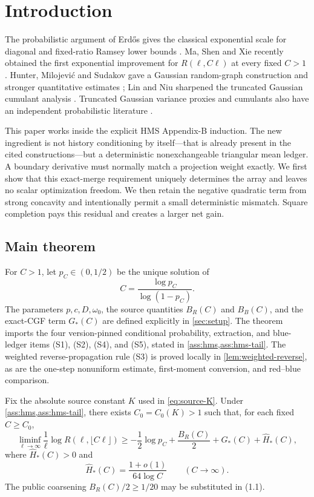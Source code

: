 \section{Introduction}

The probabilistic argument of Erd\H{o}s gives the classical exponential scale
for diagonal and fixed-ratio Ramsey lower bounds \cite{Erdos1947}.  Ma, Shen
and Xie recently obtained the first exponential improvement for
\(R(\ell,C\ell)\) at every fixed \(C>1\) \cite{MaShenXie2025}.  Hunter,
Milojevi\'c and Sudakov gave a Gaussian random-graph construction and stronger
quantitative estimates \cite{HMS2025}; Lin and Niu sharpened the truncated
Gaussian cumulant analysis \cite{LinNiu2026}.  Truncated Gaussian variance
proxies and cumulants also have an independent probabilistic literature
\cite{BarretoMarchalArbel2024}.

This paper works inside the explicit HMS Appendix-B induction.  The new
ingredient is not history conditioning by itself---that is already present in
the cited constructions---but a deterministic nonexchangeable triangular
mean ledger.  A boundary derivative must normally match a projection weight
exactly.  We first show that this exact-merge requirement uniquely determines
the array and leaves no scalar optimization freedom.  We then retain the
negative quadratic term from strong concavity and intentionally permit a
small deterministic mismatch.  Square completion pays this residual and
creates a larger net gain.

\subsection{Main theorem}

For \(C>1\), let \(p_C\in(0,1/2)\) be the unique solution of
\[
 C=\frac{\log p_C}{\log(1-p_C)}.
\]
The parameters \(p,c,D,\omega_0\), the source quantities \(B_R(C)\) and
\(B_B(C)\), and the exact-CGF term \(G_*(C)\) are defined explicitly in
\cref{sec:setup}.  The theorem imports the four version-pinned conditional
probability, extraction, and blue-ledger items (S1), (S2), (S4), and (S5),
stated in \cref{ass:hms,ass:hms-tail}.  The weighted reverse-propagation rule
(S3) is proved locally in \cref{lem:weighted-reverse}, as are the one-step
nonuniform estimate, first-moment conversion, and red--blue comparison.

\begin{theorem}\label{thm:main-lower}
Fix the absolute source constant \(K\) used in \eqref{eq:source-K}.  Under
\cref{ass:hms,ass:hms-tail}, there exists \(C_0=C_0(K)>1\) such that, for each
fixed \(C\ge C_0\),
\[
\liminf_{\ell\to\infty}\frac1\ell
\log R(\ell,\lfloor C\ell\rfloor)
\ge
-\frac12\log p_C+\frac{B_R(C)}2+G_*(C)+\widehat H_*(C),
\tag{1.1}
\]
where \(\widehat H_*(C)>0\) and
\[
 \widehat H_*(C)=\frac{1+o(1)}{64\log C}\qquad(C\to\infty).
 \tag{1.2}
\]
The public coarsening \(B_R(C)/2\ge1/20\) may be substituted in (1.1).
\end{theorem}

